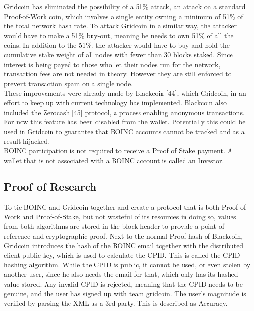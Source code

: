 Gridcoin has eliminated the possibility of a 51\% attack, an attack on a standard Proof-of-Work coin, which involves a single entity owning a minimum of 51\% of the total network hash rate. To attack Gridcoin in a similar way, the attacker would have to make a 51\% buy-out, meaning he needs to own 51\% of all the coins. In addition to the 51\%, the attacker would have to buy and hold the cumulative stake weight of all nodes with fewer than 30 blocks staked. Since interest is being payed to those who let their nodes run for the network, transaction fees are not needed in theory. However they are still enforced to prevent transaction spam on a single node.\\

These improvements were already made by Blackcoin [44], which Gridcoin, in an effort to keep up with current technology has implemented. Blackcoin also included the Zerocash [45] protocol, a process enabling anonymous transactions. For now this feature has been disabled from the wallet. Potentially this could be used in Gridcoin to guarantee that BOINC accounts cannot be tracked and as a result hijacked.\\

BOINC participation is not required to receive a Proof of Stake payment. A wallet that is not associated with a BOINC account is called an Investor.

\subsection{Proof of Research}

To tie BOINC and Gridcoin together and create a protocol that is both Proof-of-Work and Proof-of-Stake, but not wasteful of its resources in doing so, values from both algorithms are stored in the block header to provide a point of reference and cryptographic proof. Next to the normal Proof hash of Blackcoin, Gridcoin introduces the hash of the BOINC email together with the distributed client public key, which is used to calculate the CPID. This is called the CPID hashing algorithm. While the CPID is public, it cannot be used, or even stolen by another user, since he also needs the email for that, which only has its hashed value stored. Any invalid CPID is rejected, meaning that the CPID needs to be genuine, and the user has signed up with team gridcoin. The user's magnitude is verified by parsing the XML as a 3rd party. This is described as Accuracy.\\

